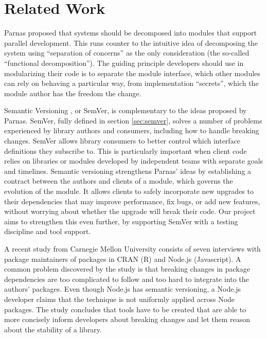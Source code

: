 \section{Related Work}

Parnas proposed \cite{Parnas} that systems should be decomposed into
modules that support parallel development. This runs counter to the
intuitive idea of decomposing the system using ``separation of
concerns'' as the only consideration (the so-called ``functional
decomposition''). The guiding principle developers should use in
modularizing their code is to separate the module interface, which
other modules can rely on behaving a particular way, from
implementation ``secrets'', which the module author has the freedom
the change. 

Semantic Versioning \cite{semver}, or SemVer, is complementary to the ideas
proposed by Parnas.
%
SemVer, fully defined in section \ref{sec:semver}, solves a number of
problems experienced by library authors and consumers, including how
to handle breaking changes.
%
SemVer allows library consumers to better control which interface
definitions they subscribe to. This is particularly important when
client code relies on libraries or modules developed by independent
teams with separate goals and timelines.
%
Semantic versioning strengthens Parnas' ideas by establishing a
contract between the authors and clients of a module, which governs
the evolution of the module. 
%
It allows clients to safely incorporate new upgrades to their
dependencies that may improve performance, fix bugs, or add new
features, without worrying about whether the upgrade will break their
code.
%
Our project aims to strengthen this even further, by supporting SemVer
with a testing discipline and tool support.

A recent study from Carnegie Mellon University \cite{bogart15-break}
consists of seven interviews with package maintainers of packages in
CRAN (R) and Node.js (Javascript). A common problem discovered by the
study is that breaking changes in package dependencies are too
complicated to follow and too hard to integrate into the authors'
packages. Even though Node.js has semantic versioning, a Node.js
developer claims that the technique is not uniformly applied across
Node packages. The study concludes that tools have to be created that
are able to more concisely inform developers about breaking changes
and let them reason about the stability of a library.

